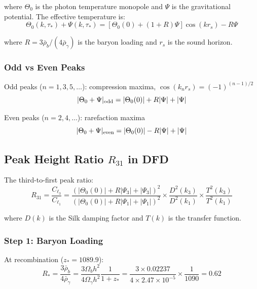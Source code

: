 \documentclass[11pt,a4paper]{article}
\begin{document}
where $\Theta_0$ is the photon temperature monopole and $\Psi$ is the gravitational potential. The effective temperature is:
\begin{equation}
\Theta_0(k, \tau_*) + \Psi(k, \tau_*) = \left[\Theta_0(0) + (1+R)\Psi\right]\cos(k r_s) - R\Psi
\end{equation}

where $R = 3\bar{\rho}_b/(4\bar{\rho}_\gamma)$ is the baryon loading and $r_s$ is the sound horizon.

\subsubsection{Odd vs Even Peaks}

Odd peaks ($n = 1, 3, 5, \ldots$): compression maxima, $\cos(k_n r_s) = (-1)^{(n-1)/2}$
\begin{equation}
|\Theta_0 + \Psi|_{\rm odd} = |\Theta_0(0)| + R|\Psi| + |\Psi|
\end{equation}

Even peaks ($n = 2, 4, \ldots$): rarefaction maxima
\begin{equation}
|\Theta_0 + \Psi|_{\rm even} = |\Theta_0(0)| - R|\Psi| + |\Psi|
\end{equation}

\subsection{Peak Height Ratio $R_{31}$ in DFD}

The third-to-first peak ratio:
\begin{equation}
R_{31} = \frac{C_{\ell_3}}{C_{\ell_1}} = \frac{(|\Theta_0(0)| + R|\Psi_3| + |\Psi_3|)^2}{(|\Theta_0(0)| + R|\Psi_1| + |\Psi_1|)^2} \times \frac{D^2(k_3)}{D^2(k_1)} \times \frac{T^2(k_3)}{T^2(k_1)}
\end{equation}

where $D(k)$ is the Silk damping factor and $T(k)$ is the transfer function.

\subsubsection{Step 1: Baryon Loading}

At recombination ($z_* = 1089.9$):
\begin{equation}
R_* = \frac{3\bar{\rho}_b}{4\bar{\rho}_\gamma} = \frac{3\Omega_b h^2}{4\Omega_\gamma h^2}\frac{1}{1+z_*} = \frac{3\times 0.02237}{4\times 2.47\times10^{-5}} \times \frac{1}{1090} = 0.62
\end{equation}
\end{document}
